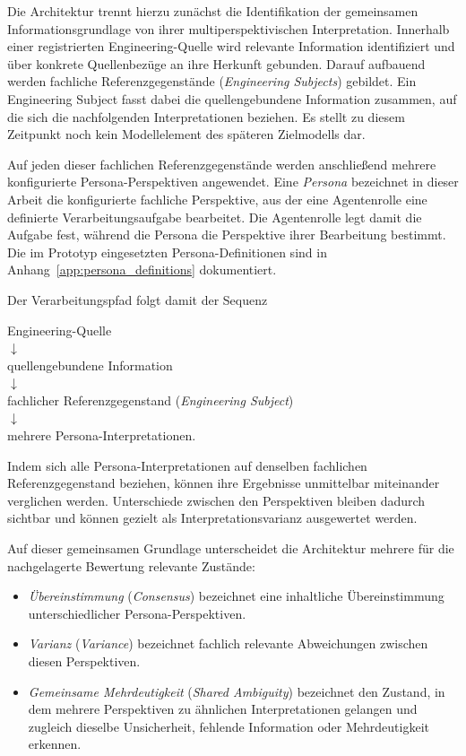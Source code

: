 Die Architektur trennt hierzu zunächst die Identifikation der gemeinsamen
Informationsgrundlage von ihrer multiperspektivischen Interpretation.
Innerhalb einer registrierten Engineering-Quelle wird relevante Information
identifiziert und über konkrete Quellenbezüge an ihre Herkunft gebunden.
Darauf aufbauend werden fachliche Referenzgegenstände
(\emph{Engineering Subjects}) gebildet. \newpage \noindent Ein Engineering Subject fasst dabei
die quellengebundene Information zusammen, auf die sich die nachfolgenden
Interpretationen beziehen. Es stellt zu diesem Zeitpunkt noch kein
Modellelement des späteren Zielmodells dar.

Auf jeden dieser fachlichen Referenzgegenstände werden anschließend mehrere
konfigurierte Persona-Perspektiven angewendet. Eine \emph{Persona} bezeichnet
in dieser Arbeit die konfigurierte fachliche Perspektive, aus der eine
Agentenrolle eine definierte Verarbeitungsaufgabe bearbeitet. Die
Agentenrolle legt damit die Aufgabe fest, während die Persona die Perspektive
ihrer Bearbeitung bestimmt. Die im Prototyp eingesetzten
Persona-Definitionen sind in
Anhang~\ref{app:persona_definitions} dokumentiert.

Der Verarbeitungspfad folgt damit der Sequenz

\begin{center}
Engineering-Quelle\\
$\downarrow$\\
quellengebundene Information\\
$\downarrow$\\
fachlicher Referenzgegenstand (\emph{Engineering Subject})\\
$\downarrow$\\
mehrere Persona-Interpretationen.
\end{center}

Indem sich alle Persona-Interpretationen auf denselben fachlichen
Referenzgegenstand beziehen, können ihre Ergebnisse unmittelbar miteinander
verglichen werden. Unterschiede zwischen den Perspektiven bleiben dadurch
sichtbar und können gezielt als Interpretationsvarianz ausgewertet werden.

Auf dieser gemeinsamen Grundlage unterscheidet die Architektur mehrere für
die nachgelagerte Bewertung relevante Zustände:

\begin{itemize}
    \item \emph{Übereinstimmung} (\emph{Consensus}) bezeichnet eine
    inhaltliche Übereinstimmung unterschiedlicher Persona-Perspektiven.

    \item \emph{Varianz} (\emph{Variance}) bezeichnet fachlich relevante
    Abweichungen zwischen diesen Perspektiven.

    \item \emph{Gemeinsame Mehrdeutigkeit} (\emph{Shared Ambiguity})
    bezeichnet den Zustand, in dem mehrere Perspektiven zu ähnlichen
    Interpretationen gelangen und zugleich dieselbe Unsicherheit, fehlende
    Information oder Mehrdeutigkeit erkennen.
\end{itemize}

